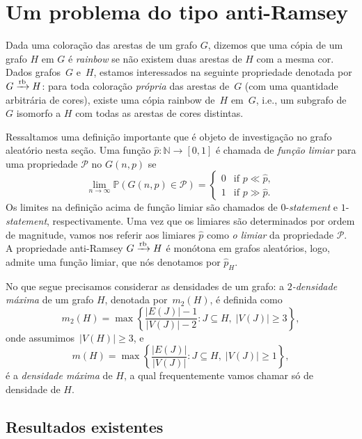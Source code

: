 \documentclass[11pt,twoside,a4paper]{book}
\def\rbarrow{\xrightarrow[]{\raisebox{0.0mm}[0mm]{$\scriptstyle \rm rb$}}}
\let\subset\subseteq
\theoremstyle{note}
\def\cP{{\mathcal P}}
\def\cP{{\mathcal P}}
\begin{document}
\section{Um problema do tipo anti-Ramsey}\label{sec:anti}

Dada uma coloração das arestas de um grafo $G$, dizemos que uma cópia de um grafo $H$ em $G$ é \emph{rainbow} se não existem duas arestas de $H$ com a mesma cor.
%
Dados grafos~$G$ e~$H$, estamos interessados na seguinte propriedade denotada por ${G\rbarrow H}$: para toda coloração \textit{própria} das arestas de~$G$ (com uma quantidade arbitrária de cores),
existe uma cópia rainbow de~$H$ em~$G$, i.e., um subgrafo de $G$ isomorfo a $H$ com todas as arestas de cores distintas.

Ressaltamos uma definição importante que é objeto de investigação no grafo aleatório nesta seção.
Uma função $\hat{p}: \mathbb{N} \rightarrow [0,1]$ é chamada de \textit{função limiar} para uma propriedade
$\cP$ no $G(n,p)$ se 
\[
  \lim_{n\to\infty}\mathbb{P}\left(G(n,p) \in \cP\right)
  =
  \begin{cases}0&\text{if }p \ll \hat p, \\
    1&\text{if }p \gg \hat p.
  \end{cases}
\]
Os limites na definição acima de função limiar são chamados de $0$-\emph{statement} e $1$-\emph{statement}, respectivamente. 
Uma vez que os limiares são determinados por ordem de magnitude, vamos nos referir aos limiares $\hat{p}$ como \emph{o limiar} da propriedade $\cP$.
A propriedade anti-Ramsey ${G\rbarrow H}$ é monótona em grafos aleatórios, logo, admite uma função limiar, que nós denotamos por $\hat{p}_H$. 


No que segue precisamos considerar as densidades de um grafo: a \emph{$2$-densidade máxima} de um grafo $H$, denotada por~$m_2(H)$, é definida como 
\begin{equation*}
  m_2(H)=\max\left\{\frac{|E(J)|-1}{|V(J)|-2}\colon J\subset H,\;|V(J)|\geq3\right\},
\end{equation*}
onde assumimos~$|V(H)|\geq3$, e 
\[
    m(H) = \max\left\{\frac{|E(J)|}{|V(J)|}\colon J\subset H,\;|V(J)|\geq1\right\},
\]
é a \emph{densidade máxima} de $H$, a qual frequentemente vamos chamar só de densidade de $H$.



\subsection{Resultados existentes}
\end{document}
